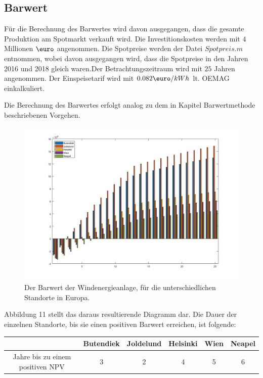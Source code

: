 \documentclass[a4paper,12pt]{article}
\begin{document}
	\subsection{Barwert}
	Für die Berechnung des Barwertes wird davon ausgegangen, dass die gesamte Produktion am Spotmarkt verkauft wird. Die Investitionskosten werden mit $4$ Millionen $\mbox{\euro}$ angenommen. Die Spotpreise werden der Datei $Spotpreis.m$ entnommen, wobei davon ausgegangen wird, dass die Spotpreise in den Jahren 2016 und 2018 gleich waren.\newline Der Betrachtungszeitraum wird mit $25$ Jahren angenommen. Der Einspeisetarif wird mit $0.082\mbox{\euro}/kWh$ lt. OEMAG einkalkuliert.\\ \par
	\noindent Die Berechnung des Barwertes erfolgt analog zu dem in Kapitel Barwertmethode beschriebenen Vorgehen.
	\begin{figure}[H]
		\centering
		\includegraphics[width=12cm]{img/results/BarwertAllerStandorte}
		\caption{Der Barwert der Windenergieanlage, für die unterschiedlichen Standorte in Europa.}
	\end{figure}
	\noindent Abbildung 11 stellt das daraus resultierende Diagramm dar.\newline
	Die Dauer der einzelnen Standorte, bis sie einen positiven Barwert erreichen, ist folgende:
	\begin{table}[H]
		\centering
		\begin{tabular}{|c|c|c|c|c|c|}
			\hline
			& Butendiek & Joldelund & Helsinki & Wien & Neapel \\ \hline
			Jahre bis zu einem positiven NPV & 3         & 2         & 4        & 5    & 6      \\ \hline
		\end{tabular}
	\end{table}
\end{document}
